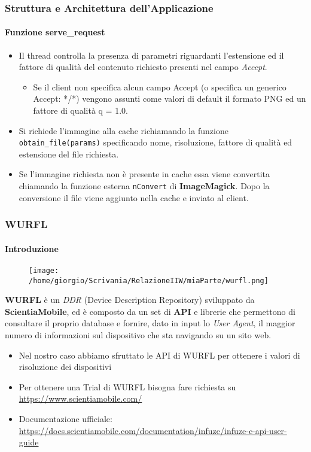 \documentclass{beamer}
\begin{document}
\begin{frame}
\frametitle{Struttura e Architettura dell'Applicazione}
\framesubtitle{Funzione serve\_request}


\begin{itemize}
\item Il thread controlla la presenza di parametri riguardanti l’estensione ed il
fattore di qualità del contenuto richiesto presenti nel campo \textit{Accept}.
\begin{itemize}
\item Se il client non specifica alcun campo
Accept (o specifica un generico Accept: */*) vengono assunti come
valori di default il formato PNG ed un fattore di qualità q = 1.0.
\end{itemize}
\item Si richiede l'immagine alla cache
richiamando la funzione \texttt{obtain\_file(params)} specificando nome,
risoluzione, fattore di qualità ed estensione del file richiesta.
\item Se l’immagine richiesta non è presente in cache essa viene convertita
chiamando la funzione esterna \texttt{nConvert} di \textbf{ImageMagick}. Dopo la conversione il file viene
aggiunto nella cache e inviato al client.
\end{itemize}

\end{frame}








\begin{frame}
\frametitle{WURFL}
\framesubtitle{Introduzione}

\begin{figure}
    \texttt{[image: /home/giorgio/Scrivania/RelazioneIIW/miaParte/wurfl.png]}
\end{figure}

\textbf{WURFL} è un \textit{DDR} (Device Description Repository) sviluppato da \textbf{ScientiaMobile}, ed è composto da un set di \textbf{API} e librerie che permettono di consultare il proprio database e fornire, dato in input lo \textit{User Agent}, il maggior
numero di informazioni sul dispositivo che sta navigando su un sito web.

\begin{itemize}
\item Nel nostro caso abbiamo sfruttato le API di WURFL per ottenere i valori di risoluzione dei dispositivi
\item Per ottenere una Trial di WURFL bisogna fare richiesta su \href{https://www.scientiamobile.com/}{\color{blue}  https://www.scientiamobile.com/}
\item Documentazione ufficiale: \href{https://docs.scientiamobile.com/documentation/infuze/infuze-c-api-user-guide}{\color{blue}  https://docs.scientiamobile.com/documentation/infuze/infuze-c-api-user-guide}

\end{itemize}
\end{frame}
\end{document}
